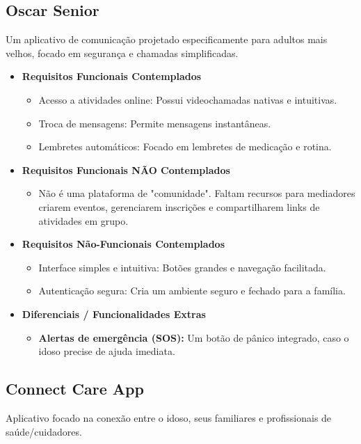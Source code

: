\subsection{Oscar Senior}
Um aplicativo de comunicação projetado especificamente para adultos mais velhos, focado em segurança e chamadas simplificadas.

\begin{itemize}
    \item \textbf{Requisitos Funcionais Contemplados}
        \begin{itemize}
            \item Acesso a atividades online: Possui videochamadas nativas e intuitivas.
            \item Troca de mensagens: Permite mensagens instantâneas.
            \item Lembretes automáticos: Focado em lembretes de medicação e rotina.
        \end{itemize}
    \item \textbf{Requisitos Funcionais NÃO Contemplados}
        \begin{itemize}
            \item Não é uma plataforma de "comunidade". Faltam recursos para mediadores criarem eventos, gerenciarem inscrições e compartilharem links de atividades em grupo.
        \end{itemize}
    \item \textbf{Requisitos Não-Funcionais Contemplados}
        \begin{itemize}
            \item Interface simples e intuitiva: Botões grandes e navegação facilitada.
            \item Autenticação segura: Cria um ambiente seguro e fechado para a família.
        \end{itemize}
    \item \textbf{Diferenciais / Funcionalidades Extras}
        \begin{itemize}
            \item \textbf{Alertas de emergência (SOS):} Um botão de pânico integrado, caso o idoso precise de ajuda imediata.
        \end{itemize}
\end{itemize}

\subsection{Connect Care App}
Aplicativo focado na conexão entre o idoso, seus familiares e profissionais de saúde/cuidadores.

